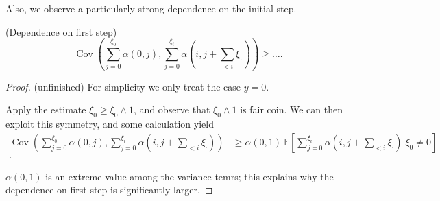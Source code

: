 Also, we observe a particularly strong dependence on the initial step.

\begin{lemma}(Dependence on first step)
	\[
		\operatorname{Cov} \left( \sum_{j = 0}^{\xi_0} \alpha(0, j), \sum_{j = 0}^{\xi_i} \alpha(i, j + \sum_{<i}\xi_\cdot ) \right)  
		\ge \ldots
.\] 
\end{lemma}
\begin{proof}
	(unfinished)
	For simplicity we only treat the case $y = 0$.

	Apply the estimate $\xi_0 \ge \xi_0 \wedge 1$, and observe that $\xi_0 \wedge 1$ is fair coin. We can then exploit this symmetry, and some calculation yield
	\begin{align*}
		\operatorname{Cov} \left( \sum_{j = 0}^{\xi_0} \alpha(0, j), \sum_{j = 0}^{\xi_i} \alpha(i, j + \sum_{<i}\xi_\cdot ) \right)  
		&\ge \alpha(0,1) \, \mathbb{E}\left[   \sum_{j = 0}^{\xi_i} \alpha(i, j + \sum_{<i}\xi_\cdot )  \bigg| \xi_0 \neq 0\right] \\
	.\end{align*} 

	$\alpha(0,1)$ is an extreme value among the variance temrs; this explains why the dependence on first step is significantly larger.
\end{proof}


